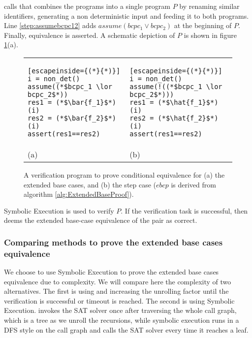  calls  that combines the programs into a single program $P$ by renaming similar identifiers, generating a non deterministic input and feeding it to both programs. 
Line \ref{step:assumebcpc12} adds $assume(bcpc_1 \lor bcpc_2)$ at the beginning of $P$. Finally, equivalence is asserted. A schematic depiction of $P$ is shown in figure \ref{fig:basegapvefprogram}(a). 
\begin{figure} 
\begin{center}
\begin{tabular}{ll}
\begin{minipage}{6.5 cm}
\begin{lstlisting}[escapeinside={(*}{*)}]
i = non_det()
assume((*$bcpc_1 \lor bcpc_2$*))
res1 = (*$\bar{f_1}$*)(i)
res2 = (*$\bar{f_2}$*)(i)
assert(res1==res2)
\end{lstlisting}
\end{minipage} &
\begin{minipage}{7 cm}
\begin{lstlisting}[escapeinside={(*}{*)}]
i = non_det()
assume(!((*$bcpc_1 \lor bcpc_2$*)))
res1 = (*$\hat{f_1}$*)(i)
res2 = (*$\hat{f_2}$*)(i)
assert(res1==res2)
\end{lstlisting}
\end{minipage} \\
(a) & (b)
\end{tabular}
\caption{A verification program to prove conditional equivalence for (a) the extended base cases, and (b) the step case ($ebcp$ is derived from algorithm \ref{alg:ExtendedBaseProof}).}
\label{fig:basegapvefprogram}
\end{center}
\end{figure}
Symbolic Execution is used to verify $P$. If the verification task is successful, then  deems the extended base-case equivalence of the pair as correct. 

\subsubsection{Comparing methods to prove the extended base cases equivalence}
We choose to use Symbolic Execution to prove the extended base cases equivalence due to complexity. We will compare here the complexity of two alternatives. The first is using  and increasing the unrolling factor until the verification is successful or timeout is reached. The second is using Symbolic Execution. 
 invokes the SAT solver once after traversing the whole call graph, which is a tree as we unroll the recursions, while symbolic execution runs in a DFS style on the call graph and calls the SAT solver every time it reaches a leaf.

